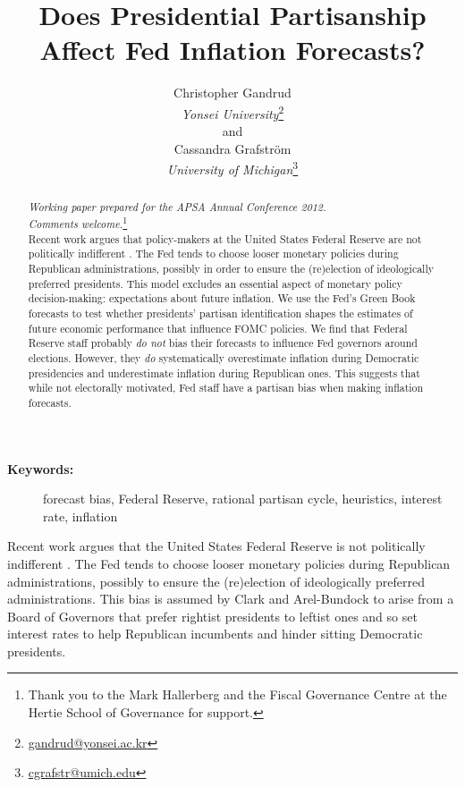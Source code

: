 \documentclass[a4paper]{article}\usepackage{graphicx, color}
\title{Does Presidential Partisanship Affect Fed Inflation Forecasts?}
\author{Christopher Gandrud \\
                {\emph{Yonsei University}}\footnote{\href{mailto:gandrud@yonsei.ac.kr}{gandrud@yonsei.ac.kr}} \\
                and \\
            Cassandra Grafstr\"{o}m \\
                {\emph{University of Michigan}}\footnote{\href{mailto:cgrafstr@umich.edu}{cgrafstr@umich.edu}}}
\begin{document}
\maketitle

\begin{abstract}
\noindent\emph{Working paper prepared for the APSA Annual Conference 2012. \\ Comments welcome.}\footnote{Thank you to the Mark Hallerberg and the Fiscal Governance Centre at the Hertie School of Governance for support.} \\[0.2cm]

Recent work argues that policy-makers at the United States Federal Reserve are not politically indifferent \citep{Clark2011}. The Fed tends to choose looser monetary policies during Republican administrations, possibly in order to ensure the (re)election of ideologically preferred presidents. This model excludes an essential aspect of monetary policy decision-making: expectations about future inflation. We use the Fed's Green Book forecasts to test whether presidents' partisan identification shapes the estimates of future economic performance that influence FOMC policies. We find that Federal Reserve staff probably {\emph{do not}} bias their forecasts to influence Fed governors around elections. However, they {\emph{do}} systematically overestimate inflation during Democratic presidencies and underestimate inflation during Republican ones. This suggests that while not electorally motivated, Fed staff have a partisan bias when making inflation forecasts.

\end{abstract}

\begin{description}
  \item [{\textbf{Keywords:}}] forecast bias, Federal Reserve, rational partisan cycle, heuristics, interest rate, inflation
\end{description}

\vspace{0.3cm}

Recent work argues that the United States Federal Reserve is not politically indifferent \citep{Clark2011}. The Fed tends to choose looser monetary policies during Republican administrations, possibly to ensure the (re)election of ideologically preferred administrations. This bias is assumed by Clark and Arel-Bundock to arise from a Board of Governors that prefer rightist presidents to leftist ones and so set interest rates to help Republican incumbents and hinder sitting Democratic presidents. 
\end{document}
